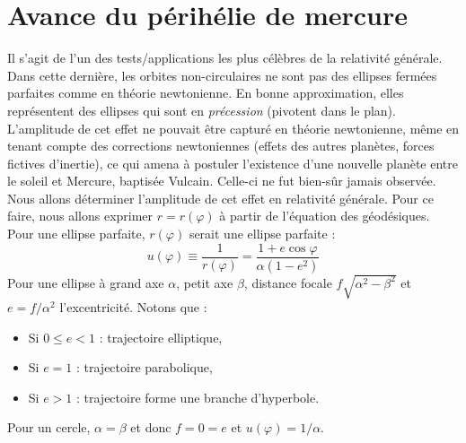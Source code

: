 \section{Avance du périhélie de mercure}
Il s'agit de l'un des tests/applications les plus célèbres de la relativité générale. Dans cette dernière, les orbites non-circulaires ne sont pas des ellipses fermées parfaites comme en théorie newtonienne. En bonne approximation, elles représentent des ellipses qui sont en \emph{précession} (pivotent dans le plan). L'amplitude de cet effet ne pouvait être capturé en théorie newtonienne, même en tenant compte des corrections newtoniennes (effets des autres planètes, forces fictives d'inertie), ce qui amena à postuler l'existence d'une nouvelle planète entre le soleil et Mercure, baptisée Vulcain. Celle-ci ne fut bien-sûr jamais observée.\\
Nous allons déterminer l'amplitude de cet effet en relativité générale. Pour ce faire, nous allons exprimer $r = r(\varphi)$ à partir de l'équation des géodésiques. Pour une ellipse parfaite, $r(\varphi)$ serait une ellipse parfaite :
\begin{equation}
    \label{équation ellipse parfaite}
    u(\varphi) \equiv \frac{1}{r(\varphi)} = \frac{1 + e\cos \varphi}{\alpha (1 - e^2)}
\end{equation}
Pour une ellipse à grand axe $\alpha$, petit axe $\beta$, distance focale $f \sqrt{\alpha^2-\beta^2}$ et $e = f/\alpha^2$ l'excentricité. Notons que :
\begin{itemize}
    \item Si $0\leq e< 1$ : trajectoire elliptique,
    \item Si $e=1$ : trajectoire parabolique,
    \item Si $e>1$ : trajectoire forme une branche d'hyperbole.
\end{itemize}
Pour un cercle, $\alpha = \beta$ et donc $f = 0 = e$ et $u(\varphi) = 1/\alpha$.

